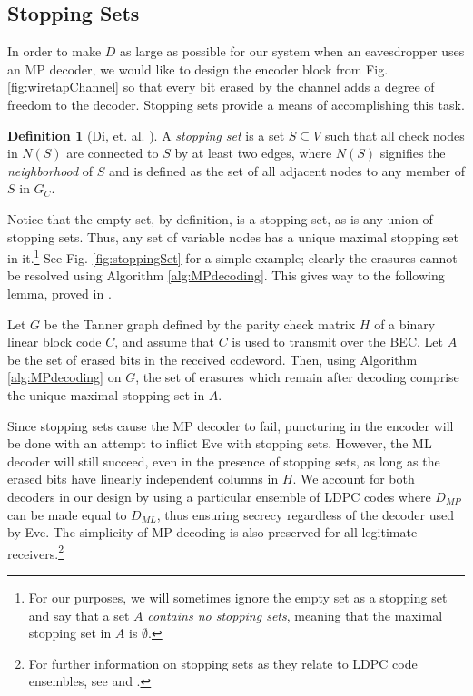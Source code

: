 \documentclass[10pt,twocolumn,twoside]{IEEEtran} \newlength{\pic}
\theoremstyle{definition}
\newtheorem{definition}{Definition}
\theoremstyle{remark}
\theoremstyle{plain}
\begin{document}
\subsection{Stopping Sets}\label{subsec:stoppingSets}

In order to make $D$ as large as possible for our system when an eavesdropper uses an MP decoder, we would like to design the encoder block from Fig. \ref{fig:wiretapChannel} so that every bit erased by the channel adds a degree of freedom to the decoder. Stopping sets provide a means of accomplishing this task.
\begin{definition}[Di, et. al. \cite{Di02StoppingSets}]\label{def:stoppingSet}
 A \emph{stopping set} is a set $S \subseteq V$ such that all check nodes in $N(S)$ are connected to $S$ by at least two edges, where $N(S)$ signifies the \emph{neighborhood} of $S$ and is defined as the set of all adjacent nodes to any member of $S$ in $G_C$.
\end{definition}
Notice that the empty set, by definition, is a stopping set, as is any union of stopping sets. Thus, any set of variable nodes has a unique maximal stopping set in it.\footnote{For our purposes, we will sometimes ignore the empty set as a stopping set and say that a set $A$ \emph{contains no stopping sets}, meaning that the maximal stopping set in $A$ is $\emptyset$.} See Fig. \ref{fig:stoppingSet} for a simple example; clearly the erasures cannot be resolved using Algorithm \ref{alg:MPdecoding}. This gives way to the following lemma, proved in \cite{Di02StoppingSets}.
\begin{lemma} \label{lem:stoppingSets}
   Let $G$ be the Tanner graph defined by the parity check matrix $H$ of a binary linear block code $C$, and assume that $C$ is used to transmit over the BEC. Let $A$ be the set of erased bits in the received codeword. Then, using Algorithm \ref{alg:MPdecoding} on $G$, the set of erasures which remain after decoding comprise the unique maximal stopping set in $A$.
\end{lemma}

Since stopping sets cause the MP decoder to fail, puncturing in the encoder will be done with an attempt to inflict Eve with stopping sets. However, the ML decoder will still succeed, even in the presence of stopping sets, as long as the erased bits have linearly independent columns in $H$. We account for both decoders in our design by using a particular ensemble of LDPC codes where $D_{MP}$ can be made equal to $D_{ML}$, thus ensuring secrecy regardless of the decoder used by Eve. The simplicity of MP decoding is also preserved for all legitimate receivers.\footnote{For further information on stopping sets as they relate to LDPC code ensembles, see \cite{Rosnes09} and \cite{Orlitsky05}.}
\end{document}
